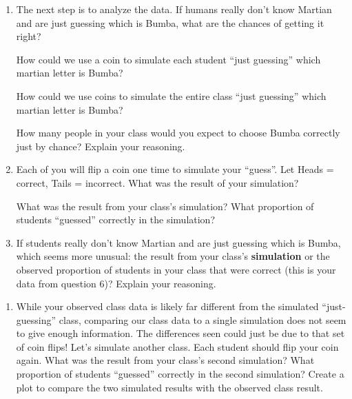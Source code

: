 \documentclass[
]{report}
\providecommand{\tightlist}{%
  \setlength{\itemsep}{0pt}\setlength{\parskip}{0pt}}
\begin{document}
\newpage

\begin{enumerate}
\def\labelenumi{\arabic{enumi}.}
\setcounter{enumi}{8}
\item
  The next step is to analyze the data. If humans really don't know Martian and are just guessing which is Bumba, what are the chances of getting it right?
  \vspace{0.5in}

  How could we use a coin to simulate each student ``just guessing'' which martian letter is Bumba?
  \vspace{1in}

  How could we use coins to simulate the entire class ``just guessing'' which martian letter is Bumba?
  \vspace{1in}

  How many people in your class would you expect to choose Bumba correctly just by chance? Explain your reasoning.
  \vspace{1in}
\item
  Each of you will flip a coin one time to simulate your ``guess''. Let Heads = correct, Tails = incorrect. What was the result of your simulation?
  \vspace{.4in}

  What was the result from your class's simulation? What proportion of students ``guessed'' correctly in the simulation?
  \vspace{.4in}
\item
  If students really don't know Martian and are just guessing which is Bumba, which seems more unusual: the result from your class's \textbf{simulation} or the observed proportion of students in your class that were correct (this is your data from question 6)? Explain your reasoning.
\end{enumerate}

\newpage

\begin{enumerate}
\def\labelenumi{\arabic{enumi}.}
\setcounter{enumi}{11}
\tightlist
\item
  While your observed class data is likely far different from the simulated ``just-guessing'' class, comparing our class data to a single simulation does not seem to give enough information. The differences seen could just be due to that set of coin flips! Let's simulate another class. Each student should flip your coin again. What was the result from your class's second simulation? What proportion of students ``guessed'' correctly in the second simulation? Create a plot to compare the two simulated results with the observed class result.
\end{enumerate}
\end{document}
